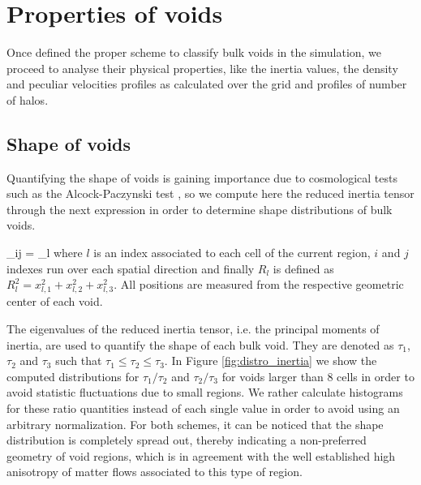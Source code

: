 \documentclass[a4,useAMS,usenatbib,usegraphicx]{latex/mn2e}
\begin{document}
\section{Properties of voids}
\label{sec:properties}


Once defined the proper scheme to classify bulk voids in the simulation,
we proceed to analyse their physical properties, like the inertia values,
the density and peculiar velocities profiles as calculated over the grid 
and profiles of number of halos.


\subsection{Shape of voids}
\label{subsec:shape_voids}


Quantifying the shape of voids is gaining importance due to cosmological 
tests such as the Alcock-Paczynski test \SRKED{[Sutter, et.al (2012)]}, so 
we compute here the reduced inertia tensor through the next expression in 
order to determine shape distributions of bulk voids.


{ \tau_{ij} = \sum_l  }
where $l$ is an index associated to each cell of the current region, 
$i$ and $j$ indexes run over each spatial direction and finally 
$R_l$ is defined as $R_l^2 = x_{l,1}^2 + x_{l,2}^2 + x_{l,3}^2$. All 
positions are measured from the respective geometric center of each void.


The eigenvalues of the reduced inertia tensor, i.e. the principal moments
of inertia, are used to quantify the shape of each bulk void. They are 
denoted as $\tau_1$, $\tau_2$ and $\tau_3$ such that $\tau_1 \leq \tau_2
\leq \tau_3$. In Figure \ref{fig:distro_inertia} we show the computed
distributions for $\tau_1/\tau_2$ and $\tau_2/\tau_3$ for voids larger 
than 8 cells in order to avoid statistic fluctuations due to small regions.
We rather calculate histograms for these ratio quantities instead of each 
single value in order to avoid using an arbitrary normalization. For both 
schemes, it can be noticed that the shape distribution is completely 
spread out, thereby indicating a non-preferred geometry of void regions, 
which is in agreement with the well established high anisotropy of matter 
flows associated to this type of region. 
\end{document}
